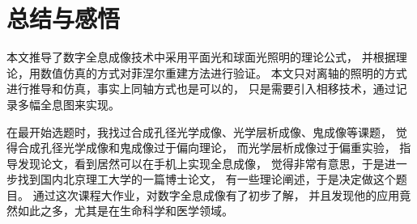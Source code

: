 \documentclass[11pt,a4paper]{article}
\begin{document}
\section{总结与感悟}
本文推导了数字全息成像技术中采用平面光和球面光照明的理论公式，
并根据理论，用数值仿真的方式对菲涅尔重建方法进行验证。
本文只对离轴的照明的方式进行推导和仿真，事实上同轴方式也是可以的，
只是需要引入相移技术，通过记录多幅全息图来实现\cite{王华英2008数字全息显微成像的理论和实验研究,kim2010principles}。

在最开始选题时，我找过合成孔径光学成像、光学层析成像、鬼成像等课题，
觉得合成孔径光学成像和鬼成像过于偏向理论，
而光学层析成像过于偏重实验，
指导发现论文\cite{breslauer2009mobile}，看到居然可以在手机上实现全息成像，
觉得非常有意思，于是进一步找到国内北京理工大学的一篇博士论文，
有一些理论阐述，于是决定做这个题目。
通过这次课程大作业，对数字全息成像有了初步了解，
并且发现他的应用竟然如此之多，尤其是在生命科学和医学领域。





\end{document}
